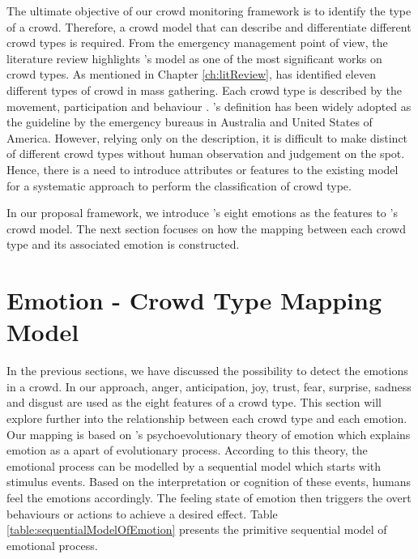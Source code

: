 The ultimate objective of our crowd monitoring framework is to identify the type of a crowd. Therefore, a crowd model that can describe and differentiate different crowd types is required. From the emergency management point of view, the literature review highlights \citet{Berlonghi1995}'s model as one of the most significant works on crowd types. As mentioned in Chapter \ref{ch:litReview}, \citet{Berlonghi1995} has identified eleven different types of crowd in mass gathering. Each crowd type is described by the movement, participation and behaviour \citep{Zeitz2009}. \citet{Berlonghi1995}'s definition has been widely adopted as the guideline by the emergency bureaus in Australia and United States of America. However, relying only on the description, it is difficult to make distinct of different crowd types without human observation and judgement on the spot. Hence, there is a need to introduce attributes or features to the existing model for a systematic approach to perform the classification of crowd type.

In our proposal framework, we introduce \citet{Plutchik1980}'s eight emotions as the features to \citet{Berlonghi1995}'s crowd model. The next section focuses on how the mapping between each crowd type and its associated emotion is constructed.

\section{Emotion - Crowd Type Mapping Model}
In the previous sections, we have discussed the possibility to detect the emotions in a crowd. In our approach, anger, anticipation, joy, trust, fear, surprise, sadness and disgust are used as the eight features of a crowd type. This section will explore further into the relationship between each crowd type and each emotion. Our mapping is based on \citet{Plutchik1980}'s psychoevolutionary theory of emotion which explains emotion as a apart of evolutionary process. According to this theory, the emotional process can be modelled by a sequential model which starts with stimulus events. Based on the interpretation or cognition of these events, humans feel the emotions accordingly. The feeling state of emotion then triggers the overt behaviours or actions to achieve a desired effect. Table \ref{table:sequentialModelOfEmotion} presents the primitive sequential model of emotional process.

